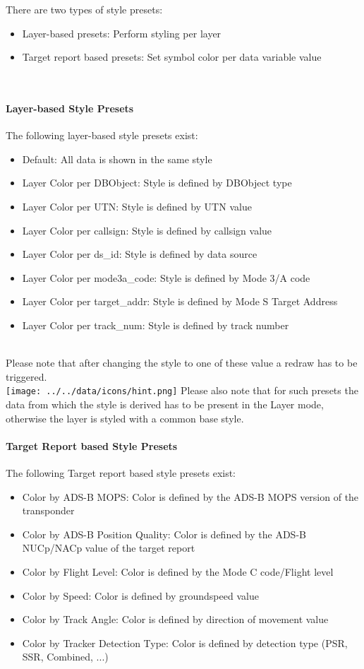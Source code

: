 There are two types of style presets:
\begin{itemize}
 \item Layer-based presets: Perform styling per layer
 \item Target report based presets: Set symbol color per data variable value
\end{itemize}
\  \\

\paragraph{Layer-based Style Presets}
The following layer-based style presets exist:
\begin{itemize}
 \item Default: All data is shown in the same style
 \item Layer Color per DBObject: Style is defined by DBObject type
 \item Layer Color per UTN: Style is defined by UTN value
 \item Layer Color per callsign: Style is defined by callsign value
 \item Layer Color per ds\_id: Style is defined by data source
 \item Layer Color per mode3a\_code: Style is defined by Mode 3/A code
 \item Layer Color per target\_addr: Style is defined by Mode S Target Address
 \item Layer Color per track\_num: Style is defined by track number
\end{itemize}
\  \\

Please note that after changing the style to one of these value a redraw has to be triggered. \\

\texttt{[image: ../../data/icons/hint.png]} Please also note that for such presets the data from which the style is derived has to be present in the Layer mode, otherwise the layer is styled with a common base style.

\paragraph{Target Report based Style Presets}
The following Target report based style presets exist:
\begin{itemize}
 \item Color by ADS-B MOPS: Color is defined by the ADS-B MOPS version of the transponder
 \item Color by ADS-B Position Quality: Color is defined by the ADS-B NUCp/NACp value of the target report
 \item Color by Flight Level: Color is defined by the Mode C code/Flight level
 \item Color by Speed: Color is defined by groundspeed value
 \item Color by Track Angle: Color is defined by direction of movement value
 \item Color by Tracker Detection Type: Color is defined by detection type (PSR, SSR, Combined, ...)
\end{itemize}
\  \\

